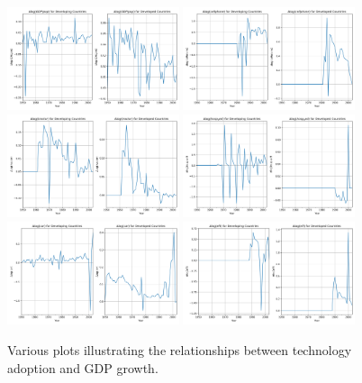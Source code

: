 \documentclass[11pt]{texMemo}
\begin{document}
\begin{figure}[htbp]
    \centering
        \includegraphics[width=0.45\textwidth]{figures/g_gdp_per_cap.png}
        \includegraphics[width=0.45\textwidth]{figures/g_cellphone.png}
        \includegraphics[width=0.45\textwidth]{figures/g_ag_tractor.png}
        \includegraphics[width=0.45\textwidth]{figures/g_bed_hosp.png}
        \includegraphics[width=0.45\textwidth]{figures/g_vehicle_car.png}
        \includegraphics[width=0.45\textwidth]{figures/g_eft.png}
        \caption{Various plots illustrating the relationships between technology adoption and GDP growth.}
        \label{fig:all_plots}
        \end{figure}
\end{document}
